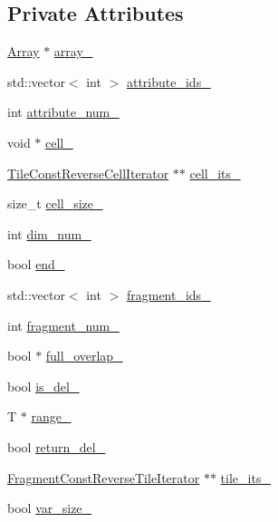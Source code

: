 \subsection*{Private Attributes}
\begin{DoxyCompactItemize}
\item 
\hyperlink{classArray}{Array} $\ast$ \hyperlink{classArrayConstReverseCellIterator_a7b36c20cde839fa5c7c76aecd3995d48}{array\+\_\+}
\item 
std\+::vector$<$ int $>$ \hyperlink{classArrayConstReverseCellIterator_a19d149d56dc7278e5d8ea54d50ad453b}{attribute\+\_\+ids\+\_\+}
\item 
int \hyperlink{classArrayConstReverseCellIterator_ac94910d5042e331562589963880bd05a}{attribute\+\_\+num\+\_\+}
\item 
void $\ast$ \hyperlink{classArrayConstReverseCellIterator_a2376714f673c25eb19838da2d4fae9ac}{cell\+\_\+}
\item 
\hyperlink{classTileConstReverseCellIterator}{Tile\+Const\+Reverse\+Cell\+Iterator} $\ast$$\ast$ \hyperlink{classArrayConstReverseCellIterator_aadcf6aacd77397b27faf6405a4c4d406}{cell\+\_\+its\+\_\+}
\item 
size\+\_\+t \hyperlink{classArrayConstReverseCellIterator_a748ade20b062b17bd18fe6a8feb41533}{cell\+\_\+size\+\_\+}
\item 
int \hyperlink{classArrayConstReverseCellIterator_aacda7582007c4940b40027f254fa2ada}{dim\+\_\+num\+\_\+}
\item 
bool \hyperlink{classArrayConstReverseCellIterator_a80133c14893b4c29077916474a0d619f}{end\+\_\+}
\item 
std\+::vector$<$ int $>$ \hyperlink{classArrayConstReverseCellIterator_a59352cf72f01630fbaf1569831ab1c50}{fragment\+\_\+ids\+\_\+}
\item 
int \hyperlink{classArrayConstReverseCellIterator_a616f2e6f4a96068623282746c0dcef3b}{fragment\+\_\+num\+\_\+}
\item 
bool $\ast$ \hyperlink{classArrayConstReverseCellIterator_a523e5c0d5dc9aab36984f9f439a0ec05}{full\+\_\+overlap\+\_\+}
\item 
bool \hyperlink{classArrayConstReverseCellIterator_af00286c2d74fdb62b27e5f1351872d34}{is\+\_\+del\+\_\+}
\item 
T $\ast$ \hyperlink{classArrayConstReverseCellIterator_a8a5a75b3a58299ea05075eb6c3987038}{range\+\_\+}
\item 
bool \hyperlink{classArrayConstReverseCellIterator_aee2b35201d187a50e2347e38d0a8d581}{return\+\_\+del\+\_\+}
\item 
\hyperlink{classFragmentConstReverseTileIterator}{Fragment\+Const\+Reverse\+Tile\+Iterator} $\ast$$\ast$ \hyperlink{classArrayConstReverseCellIterator_a3d086e369f78d6674a056c2707acd636}{tile\+\_\+its\+\_\+}
\item 
bool \hyperlink{classArrayConstReverseCellIterator_a8e34b265ffd40c681da15b32a94c8580}{var\+\_\+size\+\_\+}
\end{DoxyCompactItemize}


